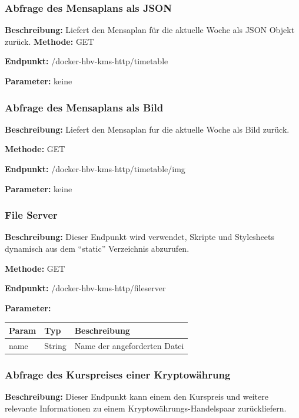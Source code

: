 \subsubsection{Abfrage des Mensaplans als JSON}
\label{sec:api-mensa-json}
\textbf{Beschreibung:} Liefert den Mensaplan für die aktuelle Woche als JSON Objekt zurück.
\textbf{Methode:} GET

\textbf{Endpunkt:} /docker-hbv-kms-http/timetable

\textbf{Parameter:} keine

\dotfill



\subsubsection{Abfrage des Mensaplans als Bild}
\label{sec:api-mensa-img}
\textbf{Beschreibung:} Liefert den Mensaplan fur die aktuelle Woche als Bild zurück.

\textbf{Methode:} GET

\textbf{Endpunkt:} /docker-hbv-kms-http/timetable/img

\textbf{Parameter:} keine

\dotfill

\subsubsection{File Server}
\label{sec:api-fileserver}
\textbf{Beschreibung:} Dieser Endpunkt wird verwendet, Skripte und Stylesheets dynamisch aus dem ``static'' Verzeichnis
abzurufen.

\textbf{Methode:} GET

\textbf{Endpunkt:} /docker-hbv-kms-http/fileserver

\textbf{Parameter:}
\begin{table}[H]
    \label{table:/docker-hbv-kms-http/fileserver}
    \setlength{\tabcolsep}{3pt}
    \begin{tabular}{p{100pt}p{80pt}p{200pt}}
        \hline
        Param & Typ    & Beschreibung                 \\
        \hline
        name  & String & Name der angeforderten Datei \\
        \hline
    \end{tabular}
\end{table}
\dotfill


\subsubsection{Abfrage des Kurspreises einer Kryptowährung}
\label{sec:api-crypto}
\textbf{Beschreibung:} Dieser Endpunkt kann einem den Kurspreis und weitere relevante Informationen zu einem
Kryptowährungs-Handelspaar zurückliefern.

